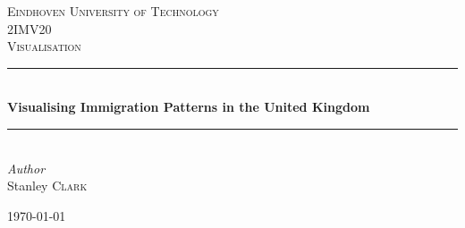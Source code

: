 \documentclass[11pt,a4paper,titlepage]{article}
\begin{document}
\begin{titlepage} %
	\newcommand{\HRule}{\rule{\linewidth}{0.5mm}} %
	
	
	\textsc{\LARGE Eindhoven University of Technology}\\[1.5cm] %
	
	\textsc{\Large 2IMV20}\\[0.5cm] %
	
	\textsc{\large Visualisation}\\[0.5cm] %
	
	
	\HRule\\[0.4cm]
	
	{\huge\bfseries Visualising Immigration Patterns in the United Kingdom}\\[0.4cm] %
	
	\HRule\\[1.5cm]
	
	
	{\large\textit{Author}}\\
	Stanley \textsc{Clark} %
	
	
	\vfill\vfill\vfill %
	
	{\large\today} %
	
	
	\vfill %
	
\end{titlepage}

\tableofcontents
\thispagestyle{empty}
\clearpage
\end{document}
